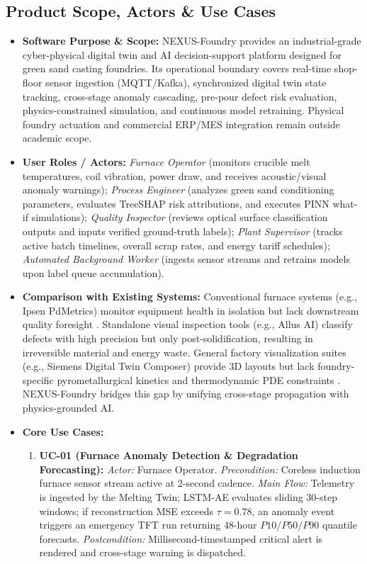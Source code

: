 \documentclass[11pt, a4paper]{article}
\begin{document}
\subsection{Product Scope, Actors \& Use Cases}
\begin{itemize}[noitemsep, topsep=2pt]
    \item \textbf{Software Purpose \& Scope:} NEXUS-Foundry provides an industrial-grade cyber-physical digital twin and AI decision-support platform designed for green sand casting foundries. Its operational boundary covers real-time shop-floor sensor ingestion (MQTT/Kafka), synchronized digital twin state tracking, cross-stage anomaly cascading, pre-pour defect risk evaluation, physics-constrained simulation, and continuous model retraining. Physical foundry actuation and commercial ERP/MES integration remain outside academic scope.
    \item \textbf{User Roles / Actors:} 
    \textit{Furnace Operator} (monitors crucible melt temperatures, coil vibration, power draw, and receives acoustic/visual anomaly warnings); 
    \textit{Process Engineer} (analyzes green sand conditioning parameters, evaluates TreeSHAP risk attributions, and executes PINN what-if simulations); 
    \textit{Quality Inspector} (reviews optical surface classification outputs and inputs verified ground-truth labels); 
    \textit{Plant Supervisor} (tracks active batch timelines, overall scrap rates, and energy tariff schedules); 
    \textit{Automated Background Worker} (ingests sensor streams and retrains models upon label queue accumulation).
    \item \textbf{Comparison with Existing Systems:} Conventional furnace systems (e.g., Ipsen PdMetrics) monitor equipment health in isolation but lack downstream quality foresight \cite{vijaykumar2025}. Standalone visual inspection tools (e.g., Allus AI) classify defects with high precision but only post-solidification, resulting in irreversible material and energy waste. General factory visualization suites (e.g., Siemens Digital Twin Composer) provide 3D layouts but lack foundry-specific pyrometallurgical kinetics and thermodynamic PDE constraints \cite{vanwyk2024, zhou2025}. NEXUS-Foundry bridges this gap by unifying cross-stage propagation with physics-grounded AI.
    \item \textbf{Core Use Cases:}
    \begin{enumerate}[noitemsep, topsep=2pt]
        \item \textbf{UC-01 (Furnace Anomaly Detection \& Degradation Forecasting):} \textit{Actor:} Furnace Operator. \textit{Precondition:} Coreless induction furnace sensor stream active at 2-second cadence. \textit{Main Flow:} Telemetry is ingested by the Melting Twin; LSTM-AE evaluates sliding 30-step windows; if reconstruction MSE exceeds $\tau = 0.78$, an anomaly event triggers an emergency TFT run returning 48-hour $P10/P50/P90$ quantile forecasts. \textit{Postcondition:} Millisecond-timestamped critical alert is rendered and cross-stage warning is dispatched.

\end{enumerate}
\end{itemize}
\end{document}

